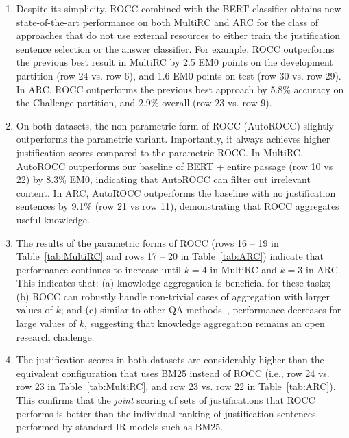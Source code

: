 \begin{enumerate}[label={\bf(\arabic*)}, topsep=0.2em, itemsep=0.1em, wide, labelwidth=!, labelindent=0pt]
\item Despite its simplicity, ROCC combined with the BERT classifier obtains new state-of-the-art performance on both MultiRC and ARC for the class of approaches that do not use external resources to either train the justification sentence selection or the answer classifier. For example, ROCC outperforms the previous best result in MultiRC by 2.5 EM0 points on the development partition (row 24 vs. row 6), and 1.6 EM0 points on test (row 30 vs. row 29). In ARC, ROCC outperforms the previous best approach by 5.8\% accuracy on the Challenge partition, and 2.9\% overall (row 23 vs. row 9). 

\item On both datasets, the non-parametric form of ROCC (AutoROCC) slightly outperforms the parametric variant. Importantly, it always achieves higher justification scores compared to the parametric ROCC. In MultiRC, AutoROCC outperforms our baseline of BERT + entire passage (row 10 vs 22)  by 8.3\% EM0, indicating that AutoROCC can filter out irrelevant content. In ARC, AutoROCC outperforms the baseline with no justification sentences by 9.1\% (row 21 vs row 11), demonstrating that ROCC aggregates useful knowledge.

\item The results of the parametric forms of ROCC (rows 16 -- 19 in Table~\ref{tab:MultiRC} and rows 17 -- 20 in Table~\ref{tab:ARC}) indicate that performance continues to increase until $k = 4$ in MultiRC and $k = 3$ in ARC. This indicates that: (a) knowledge aggregation is beneficial for these tasks; (b) ROCC can robustly handle non-trivial cases of aggregation with larger values of $k$; and (c) similar to other QA methods~\cite{chen2019understanding}, performance decreases for large values of $k$, suggesting that knowledge aggregation remains an open research challenge. 

\item The justification scores in both datasets are considerably higher than the equivalent configuration that uses BM25 instead of ROCC (i.e., row 24 vs. row 23 in Table~\ref{tab:MultiRC}, and row 23 vs. row 22 in Table~\ref{tab:ARC}). 
This confirms that the {\em joint} scoring of sets of justifications that ROCC performs is better than the individual ranking of justification sentences performed by standard IR models such as BM25. 
\end{enumerate}

